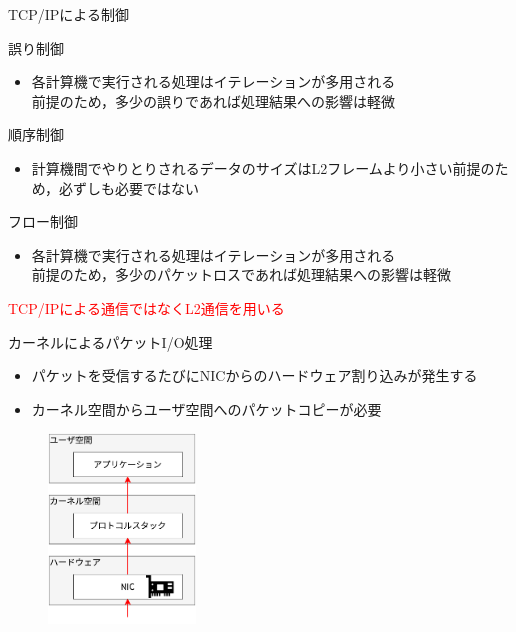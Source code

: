 \documentclass[12pt, unicode]{beamer}
\begin{document}
\begin{frame}{TCP/IPによる制御}
  \begin{block}{誤り制御}
    \begin{itemize}
      \item 各計算機で実行される処理はイテレーションが多用される\\前提のため，多少の誤りであれば処理結果への影響は軽微
    \end{itemize}
  \end{block}

  \begin{block}{順序制御}
    \begin{itemize}
      \item 計算機間でやりとりされるデータのサイズはL2フレームより小さい前提のため，必ずしも必要ではない
    \end{itemize}
  \end{block}

  \begin{block}{フロー制御}
    \begin{itemize}
      \item 各計算機で実行される処理はイテレーションが多用される\\前提のため，多少のパケットロスであれば処理結果への影響は軽微
    \end{itemize}
  \end{block}

  \begin{center}
    \large{\textcolor{red}{TCP/IPによる通信ではなくL2通信を用いる}}
  \end{center}
\end{frame}

\begin{frame}{カーネルによるパケットI/O処理}
  \begin{itemize}
    \item パケットを受信するたびにNICからのハードウェア割り込みが発生する
    \item カーネル空間からユーザ空間へのパケットコピーが必要
  \end{itemize}

  \begin{figure}[h]
    \centering
    \includegraphics[width=0.35\textwidth]{pictures/KernelPacketIO.pdf}
  \end{figure}
\end{frame}
\end{document}
